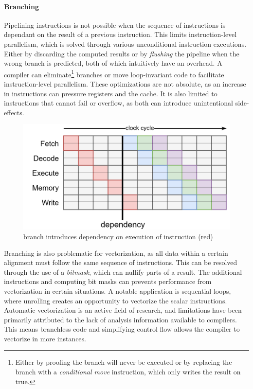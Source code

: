 \documentclass{article}
\begin{document}
\paragraph{Branching}

Pipelining instructions is not possible when the sequence of instructions is dependant on the result of a previous instruction.
This limits instruction-level parallelism, which is solved through various unconditional instruction executions\cite{instruction-level-parallelism}.
Either by discarding the computed results or by {\it flushing} the pipeline when the wrong branch is predicted, both of which intuitively have an overhead.
A compiler can eliminate\footnote{Either by proofing the branch will never be executed or by replacing the branch with a {\it conditional move} instruction, which only writes the result on true.}  branches or move loop-invariant code to facilitate instruction-level parallelism\cite{assembly-optimizations}. 
These optimizations are not absolute, as an increase in instructions can pressure registers and the cache.  
It is also limited to instructions that cannot fail or overflow, as both can introduce unintentional side-effects.  

\begin{figure}[ht]
    \centering
    \includegraphics[scale=0.15]{branchcost}
    \caption{ branch introduces dependency on execution of instruction (red) }
\end{figure}

Branching is also problematic for vectorization, as all data within a certain alignment must follow the same sequence of instructions.
This can be resolved through the use of a {\it bitmask}, which can nullify parts of a result\cite{assembly-optimizations}.  
The additional instructions and computing bit masks can prevents performance from vectorization in certain situations.  
A notable application is sequential loops, where unrolling creates an opportunity to vectorize the scalar instructions.
Automatic vectorization is an active field of research, and limitations have been primarily attributed to the lack of analysis information available to compilers\cite{automatic-vectorization}. 
This means branchless code and simplifying control flow allows the compiler to vectorize in more instances.
\end{document}
